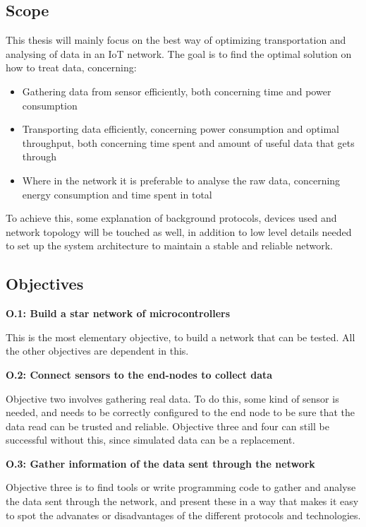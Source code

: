 \subsection{Scope}

\noindent This thesis will mainly focus on the best way of optimizing transportation and analysing of data in an IoT network. The goal is to find the optimal solution on how to treat data, concerning:

\begin{itemize}
	\item Gathering data from sensor efficiently, both concerning time and power consumption
	\item Transporting data efficiently, concerning power consumption and optimal throughput, both concerning time spent and amount of useful data that gets through
	\item Where in the network it is preferable to analyse the raw data, concerning energy consumption and time spent in total
\end{itemize}

To achieve this, some explanation of background protocols, devices used and network topology will be touched as well, in addition to low level details needed to set up the system architecture to maintain a stable and reliable network. 


\subsection{Objectives}

\noindent \textbf{O.1: Build a star network of microcontrollers}

\noindent This is the most elementary objective, to build a network that can be tested. All the other objectives are dependent in this.  

\noindent\textbf{O.2: Connect sensors to the end-nodes to collect data}

\noindent Objective two involves gathering real data. To do this, some kind of sensor is needed, and needs to be correctly configured to the end node to be sure that the data read can be trusted and reliable. Objective three and four can still be successful without this, since simulated data can be a replacement.  

\noindent\textbf{O.3: Gather information of the data sent through the network}

\noindent Objective three is to find tools or write programming code to gather and analyse the data sent through the network, and present these in a way that makes it easy to spot the advanates or disadvantages of the different protocols and technologies. 

